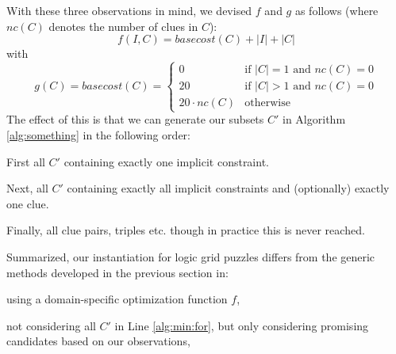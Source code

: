 With these three observations in mind, we devised $f$ and $g$ as follows (where $nc(C)$ denotes the number of clues in $C$): 
\[f(I,C) = basecost(C) + |I| + |C|\] with 
\[g(C) = basecost(C) = \left\{\begin{array}{ll}
                               0 & \text{if $|C|=1$ and $nc(C) = 0$}\\
                               20 & \text{if $|C|>1$ and $nc(C)=0$}\\
                               20\cdot nc(C) & \text{otherwise}
                              \end{array}\right.
                              \]
The effect of this is that we can generate our subsets $C'$ in Algorithm \ref{alg:something} in the following order:
\begin{compactitem}
 \item First all $C'$ containing exactly one implicit constraint.
 \item Next, all $C'$ containing exactly all implicit constraints and (optionally) exactly one clue.
 \item Finally, all clue pairs, triples etc. though in practice this is never reached.
\end{compactitem}
Summarized, our instantiation for logic grid puzzles differs from the generic methods developed in the previous section in:
\begin{compactitem}
 \item using a domain-specific optimization function $f$, 
 \item not considering all $C'$ in Line \ref{alg:min:for}, but only considering promising candidates based on our observations,
 \item 
\end{compactitem}




